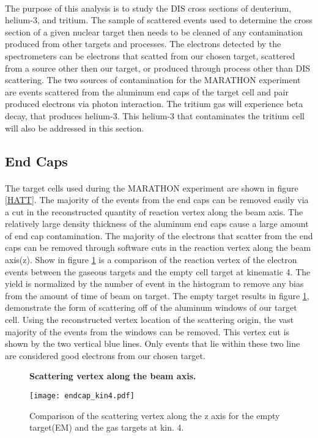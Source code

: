 \paragraph{} The purpose of this analysis is to study the DIS cross sections of deuterium, helium-3, and tritium. The sample of scattered events used to determine the cross section of a given nuclear target then needs to be cleaned of any contamination produced from other targets and processes. The electrons detected by the spectrometers can be electrons that scatted from our chosen target, scattered from a source other then our target, or produced through process other than DIS scattering. The two sources of contamination for the MARATHON experiment are events scattered from the aluminum end caps of the target cell and pair produced electrons via photon interaction. The tritium gas will experience beta decay, that produces helium-3. This helium-3 that contaminates the tritium cell will also be addressed in this section.
\subsection{End Caps}
\paragraph{} The target cells used during the MARATHON experiment are shown in figure \ref{HATT}. The majority of the events from the end caps can be removed easily via a cut in the reconstructed quantity of reaction vertex along the beam axis. The relatively large density thickness of the aluminum end caps cause a large amount of end cap contamination. The majority of the electrons that scatter from the end caps can be removed through software cuts in the reaction vertex along the beam axis(z). Show in figure \ref{EC5} is a comparison of the reaction vertex of the electron events between the gaseous targets and the empty cell target at kinematic 4. The yield is normalized by the number of event in the histogram to remove any bias from the amount of time of beam on target. The empty target  results in figure \ref{EC5}, demonstrate the form of scattering off of the aluminum windows of our target cell. Using the reconstructed vertex location of the scattering origin, the vast majority of the events from the windows can be removed. This vertex cut is shown by the two vertical blue lines. Only events that lie within these two line are considered good electrons from our chosen target. 


\begin{figure}[]
	\centering
	\textbf{Scattering vertex along the beam axis. }\par\medskip
	\texttt{[image: endcap\_kin4.pdf]}
	\caption{Comparison of the scattering vertex along the z axis for the empty target(EM) and the gas targets at kin. 4. }
	\label{EC5}
\end{figure}

